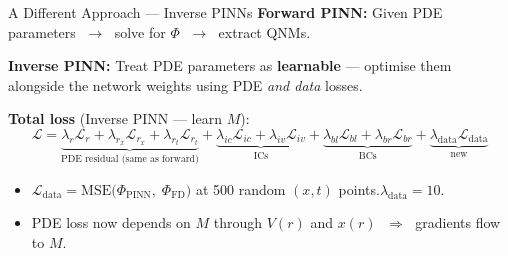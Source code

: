 \documentclass[aspectratio=169, 11pt]{beamer}
\newcommand{\pinn}{PINN}
\newcommand{\qnms}{QNMs}
\begin{document}
\begin{frame}{A Different Approach --- Inverse PINNs}
  \textbf{Forward \pinn{}:}\; Given PDE parameters
  $\;\to\;$ solve for $\Phi$ $\;\to\;$ extract \qnms{}.

  \medskip
  \textbf{Inverse \pinn{}:}\; Treat PDE parameters as \textbf{learnable}
  --- optimise them alongside the network weights using PDE \emph{and data} losses.

  \medskip
  \begin{center}
  \end{center}

  \medskip
  \textbf{Total loss} (Inverse PINN --- learn $M$):
  \[
    \mathcal{L} = \underbrace{\lambda_r\mathcal{L}_r + \lambda_{r_x}\mathcal{L}_{r_x}
    + \lambda_{r_t}\mathcal{L}_{r_t}}_{\text{PDE residual (same as forward)}}
    + \underbrace{\lambda_{ic}\mathcal{L}_{ic} + \lambda_{iv}\mathcal{L}_{iv}}_{\text{ICs}}
    + \underbrace{\lambda_{bl}\mathcal{L}_{bl} + \lambda_{br}\mathcal{L}_{br}}_{\text{BCs}}
    + \underbrace{\lambda_{\text{data}}\mathcal{L}_{\text{data}}}_{\text{new}}
  \]
  \begin{itemize}
    \item $\mathcal{L}_{\text{data}} = \text{MSE}\!\bigl(\Phi_{\text{PINN}},\;\Phi_{\text{FD}}\bigr)$
          at 500 random $(x,t)$ points.\quad $\lambda_{\text{data}} = 10$.
    \item PDE loss now depends on $M$ through $V(r)$ and $x(r)$
          $\;\Rightarrow\;$ gradients flow to $M$.
  \end{itemize}
\end{frame}
\end{document}
